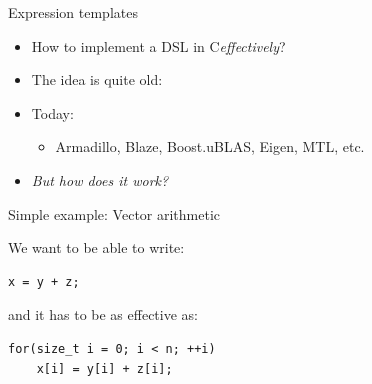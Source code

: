 \documentclass[@BEAMER_OPTIONS@]{beamer}
\newcommand{\CXX}{{\rm C}\plusplus}
\begin{document}
\begin{frame}{Expression templates}
    \begin{itemize}
        \item How to implement a DSL in \CXX \emph{effectively}?
            \vspace{\baselineskip}
        \item The idea is quite old:
        \item Today:
            \begin{itemize}
                \item Armadillo, Blaze, Boost.uBLAS, Eigen, MTL, etc.
            \end{itemize}
            \vspace{\baselineskip}
        \item \alert{\emph{But how does it work?}}
    \end{itemize}
\end{frame}

\note{ }

\begin{frame}[fragile]{Simple example: Vector arithmetic}
    \begin{exampleblock}{We want to be able to write:}
        \begin{lstlisting}
x = y + z;
        \end{lstlisting}
    \end{exampleblock}

    \begin{exampleblock}{and it has to be as effective as:}
        \begin{lstlisting}
for(size_t i = 0; i < n; ++i)
    x[i] = y[i] + z[i];
        \end{lstlisting}
    \end{exampleblock}
\end{frame}
\end{document}
